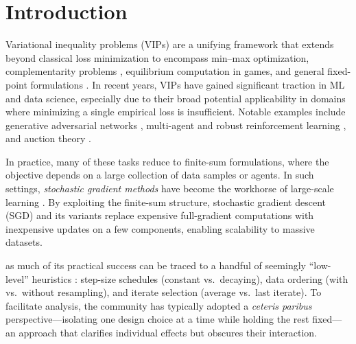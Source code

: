 

\section{Introduction}
Variational inequality problems (VIPs) \citep{stampacchia1964formes} are a 
unifying framework that extends beyond classical loss minimization to encompass min–max optimization, complementarity problems \citep{dantzig1968complementary,facchinei2003finite}, equilibrium computation in games, and general fixed-point formulations  \citep{bauschke2017convex}. In recent years, VIPs have gained significant traction in ML and data science, especially due to their broad potential applicability in domains where minimizing a single empirical loss is insufficient. Notable examples
include generative adversarial networks \citep{goodfellow2014generative,arjovsky2017wasserstein}, multi-agent and robust reinforcement learning \citep{namkoong2016stochastic,wang2021adversarial,giannou2022convergence}, and auction theory \citep{syrgkanis2015fast}.

In practice, many of these tasks reduce to finite-sum formulations, where the objective depends on a large collection of data samples or agents. In such settings, \emph{stochastic gradient methods} have become the workhorse of large-scale learning \citep{bottou2018optimization}. By exploiting the finite-sum structure, stochastic gradient descent (SGD) and its variants replace expensive full-gradient computations with inexpensive updates on a few components, enabling scalability to massive datasets. 

 as much of its practical success can be traced to a handful of seemingly “low-level” heuristics \citep{bottou2012stochastic}: step-size schedules (constant vs.\ decaying), data ordering (with vs.\ without resampling), and iterate selection (average vs.\ last iterate). To facilitate analysis, the community has typically adopted a \emph{ceteris paribus} perspective—isolating one design choice at a time while holding the rest fixed—an approach that clarifies individual effects but obscures their interaction.

